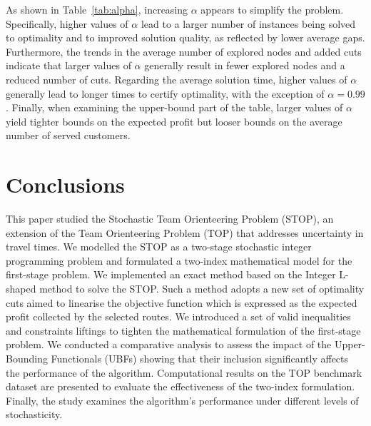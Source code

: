 \documentclass[11pt]{article}
\theoremstyle{definition}
\begin{document}
As shown in Table~\ref{tab:alpha}, increasing $\alpha$ appears to simplify the problem. Specifically, higher values of $\alpha$ lead to a larger number of instances being solved to optimality and to improved solution quality, as reflected by lower average gaps. Furthermore, the trends in the average number of explored nodes and added cuts indicate that larger values of $\alpha$ generally result in fewer explored nodes and a reduced number of cuts. Regarding the average solution time, higher values of $\alpha$ generally lead to longer times to certify optimality, with the exception of $\alpha = 0.99$. Finally, when examining the upper-bound part of the table, larger values of $\alpha$ yield tighter bounds on the expected profit but looser bounds on the average number of served customers.

\section{Conclusions}
\label{sec:end}

This paper studied the Stochastic Team Orienteering Problem (STOP), an extension of the Team Orienteering Problem (TOP) that addresses uncertainty in travel times. We modelled the STOP as a two-stage stochastic integer programming problem and formulated a two-index mathematical model for the first-stage problem.
We implemented an exact method based on the Integer L-shaped method to solve the STOP. Such a method adopts a new set of optimality cuts aimed to linearise the objective function which is expressed as the expected profit collected by the selected routes. We introduced a set of valid inequalities and constraints liftings to tighten the mathematical formulation of the first-stage problem. We conducted a comparative analysis to assess the impact of the Upper-Bounding Functionals (UBFs) showing that their inclusion significantly affects the performance of the algorithm. Computational results on the TOP benchmark dataset are presented to evaluate the effectiveness of the two-index formulation. Finally, the study examines the algorithm’s performance under different levels of stochasticity.



%



\end{document}
